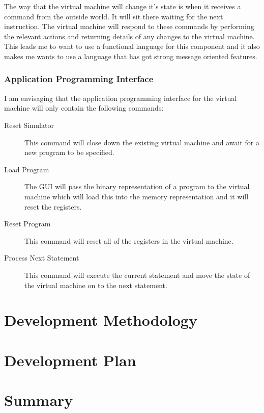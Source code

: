 \documentclass[11pt]{article} %
\begin{document}
The way that the virtual machine will change it's state is when it receives a command from the outside world. It will sit there waiting for the next instruction. The virtual machine will respond to these commands by performing the relevant actions and returning details of any changes to the virtual machine.  This leads me to want to use a functional language for this component and it also makes me wants to use a language that has got strong message oriented features.

\subsubsection{Application Programming Interface}
I am envisaging that the application programming interface for the virtual machine will only contain the following commands:

\begin{description}
	\item[Reset Simulator] This command will close down the existing virtual machine and await for a new program to be specified.
	\item[Load Program] The GUI will pass the binary representation of a program to the virtual machine which will load this into the memory representation and it will reset the registers.
	\item[Reset Program] This command will reset all of the registers in the virtual machine.
	\item[Process Next Statement] This command will execute the current statement and move the state of the virtual machine on to the next statement.
\end{description}

\section{Development Methodology}


\section{Development Plan}


\section{Summary}
\end{document}
